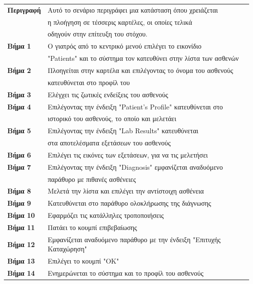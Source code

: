 \documentclass{article}
\newcommand\T{\rule{0pt}{2.6ex}}       %
\newcommand\B{\rule[-1.2ex]{0pt}{0pt}}
\begin{document}
 \begin{center}
     \begin{tabular}{|l|l|}
     \hline
      \textbf{Περιγραφή} & Αυτό το σενάριο περιγράφει μια κατάσταση όπου χρειάζεται \T \\& η πλοήγηση σε τέσσερις καρτέλες, οι οποίες τελικά\\& οδηγούν στην επίτευξη του στόχου. \B \\ 
      \hline
      \textbf{Βήμα 1} & Ο γιατρός από το κεντρικό μενού επιλέγει το εικονίδιο \T \\& "Patients" και το σύστημα τον κατευθύνει στην λίστα των ασθενών \B \\
      \hline
      \textbf{Βήμα 2} & Πλοηγείται στην καρτέλα και επιλέγοντας το όνομα του ασθενούς \T \\& κατευθύνεται στο προφίλ του  \B \\
      \hline
      \textbf{Βήμα 3} & Ελέγχει τις ζωτικές ενδείξεις του ασθενούς \T\B \\
      \hline
      \textbf{Βήμα 4} & Επιλέγοντας την ένδειξη "Patient's Profile" κατευθύνεται στο \T\\& ιστορικό του ασθενούς, το οποίο και μελετάει \B \\
      \hline
      \textbf{Βήμα 5} & Επιλέγοντας την ένδειξη "Lab Results" κατευθύνεται \T \\& στα αποτελέσματα εξετάσεων του ασθενούς \B \\
      \hline
      \textbf{Βήμα 6} & Επιλέγει τις εικόνες των εξετάσεων, για να τις μελετήσει \T\B \\
      \hline
      \textbf{Βήμα 7} & Επιλέγοντας την ένδειξη "Diagnosis" εμφανίζεται αναδυόμενο \T \\& παράθυρο με πιθανές ασθένειες \B \\
      \hline
      \textbf{Βήμα 8} & Μελετά την λίστα και επιλέγει την αντίστοιχη ασθένεια\T\B \\
      \hline      
      \textbf{Βήμα 9} & Κατευθύνεται στο παράθυρο ολοκλήρωσης της διάγνωσης \T\B \\
      \hline
      \textbf{Βήμα 10} & Εφαρμόζει τις κατάλληλες τροποποιήσεις \T\B \\
      \hline
      \textbf{Βήμα 11} & Πατάει το κουμπί επιβεβαίωσης \T\B \\
      \hline
      \textbf{Βήμα 12} & Εμφανίζεται αναδυόμενο παράθυρο με την ένδειξη "Επιτυχής Καταχώρηση" \T\B \\
      \hline    
      \textbf{Βήμα 13} & Επιλέγει το κουμπί "ΟΚ"\T\B \\ 
      \hline
      \textbf{Βήμα 14} & Ενημερώνεται το σύστημα και το προφίλ του ασθενούς \T\B \\
      \hline
     \end{tabular}
 \end{center}
 
\end{document}
